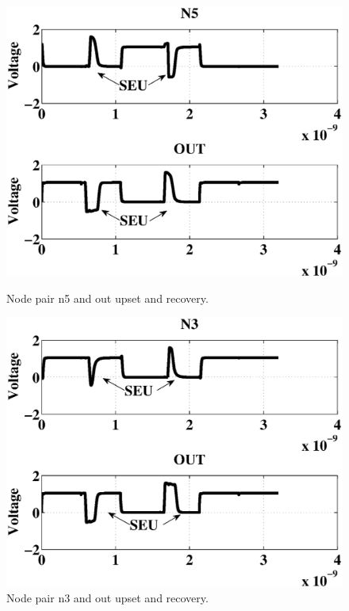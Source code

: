 \begin{figure}[!htbp]
	\centering
	\parbox{4cm}{
		\includegraphics[width=\linewidth]{Figures/WavePlots/n5out.eps}
		\caption{Node pair n5 and out upset and recovery.}
		\label{fig:n3out}}
	\qquad
	\begin{minipage}{4cm}
		\includegraphics[width=\linewidth]{Figures/WavePlots/n3out.eps}
		\caption{Node pair n3 and out upset and recovery.}
		\label{fig:n5n6}
	\end{minipage}
\end{figure}